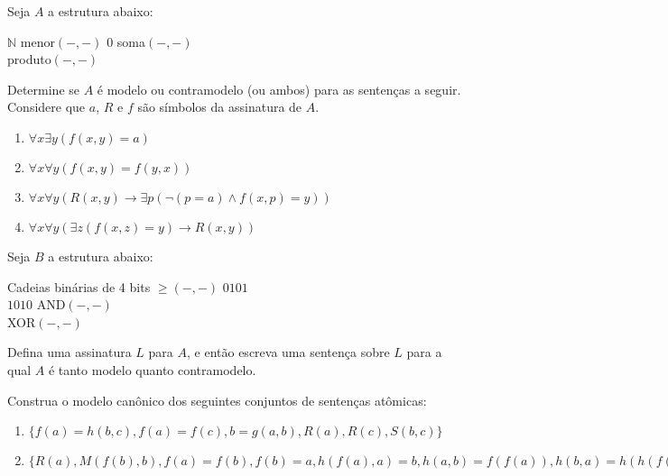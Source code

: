 \begin{exercises}
    \begin{question}
        Seja $A$ a estrutura abaixo:
        \begin{center}
            \begin{structure}
                {$\mathbb{N}$}
                {}
                {menor$(-,-)$}
                {$0$}
                {soma$(-,-)$\\produto$(-,-)$}
            \end{structure}
        \end{center}
        Determine se $A$ é modelo ou contramodelo (ou ambos) para as sentenças a seguir. Considere que $a$, $R$ e $f$ são símbolos da assinatura de $A$.
        \begin{enumerate}
            \item $\forall x\exists y (f(x, y) = a)$
            \item $\forall x\forall y(f(x, y) = f(y, x))$
            \item $\forall x\forall y(R(x, y) \rightarrow \exists p(\neg (p = a) \land f(x, p) = y))$
            \item $\forall x\forall y(\exists z (f(x, z) = y) \rightarrow R(x, y))$
        \end{enumerate} 
    \end{question}

    \begin{question}
        Seja $B$ a estrutura abaixo:
        \begin{center}
            \begin{structure}
                {Cadeias binárias de 4 bits}
                {}
                {$\geq$$(-,-)$}
                {$0101$\\$1010$}
                {AND$(-,-)$\\XOR$(-,-)$}
            \end{structure}
        \end{center}
        Defina uma assinatura $L$ para $A$, e então escreva uma sentença sobre $L$ para a qual $A$ é tanto modelo quanto contramodelo.
    \end{question}

    \begin{question}
        Construa o modelo canônico dos seguintes conjuntos de sentenças atômicas:
        \begin{enumerate}
            \item $\{f(a) = h(b, c), f(a) = f(c), b = g(a, b), R(a), R(c), S(b, c)\}$
            \item $\{R(a), M(f(b), b), f(a) = f(b), f(b) = a, h(f(a), a) = b, h(a, b) = f(f(a)), h(b, a) = h(h(f(a), a), b), R(h(f(h(a, b)), b)), M(a, a)\}$
        \end{enumerate}
    \end{question}


\end{exercises}
